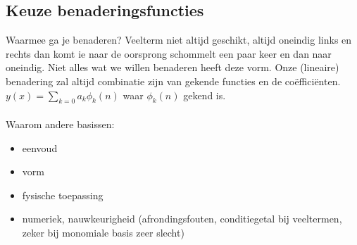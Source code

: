 \subsection{Keuze benaderingsfuncties}
Waarmee ga je benaderen? Veelterm niet altijd geschikt, altijd oneindig links en rechts dan komt ie naar de oorsprong schommelt een paar keer en dan naar oneindig. Niet alles wat we willen benaderen heeft deze vorm.
Onze (lineaire) benadering zal altijd combinatie zijn van gekende functies en de co\"effici\"enten.
$y(x)=\sum_{k=0} a_k \phi_k(n)$ waar $ \phi_k(n)$ gekend is.
\\\\
Waarom andere basissen:
\begin{itemize}
	\item eenvoud
	\item vorm
	\item fysische toepassing
	\item numeriek, nauwkeurigheid (afrondingsfouten, conditiegetal bij veeltermen, zeker bij monomiale basis zeer slecht)
\end{itemize}
